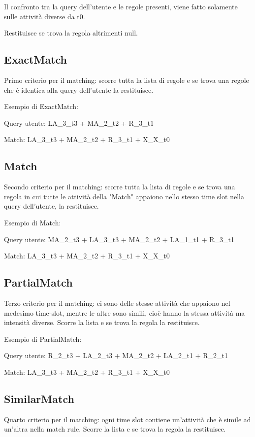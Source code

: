 \documentclass[a4paper]{article}
\begin{document}
Il confronto tra la query dell'utente e le regole presenti, viene fatto solamente sulle attività diverse da t0.

Restituisce se trova la regola altrimenti null.

\subsection{ExactMatch}
Primo criterio per il matching: scorre tutta la lista di regole e se trova una regole che è identica alla query dell'utente la restituisce. 

Esempio di ExactMatch: 

Query utente: LA\_3\_t3 + MA\_2\_t2 + R\_3\_t1

Match: LA\_3\_t3 + MA\_2\_t2 + R\_3\_t1 + X\_X\_t0

\subsection{Match}
Secondo criterio per il matching: scorre tutta la lista di regole e se trova una regola in cui tutte le attività della "Match" appaiono nello stesso time slot nella query dell'utente, la restituisce.

Esempio di Match: 

Query utente: MA\_2\_t3 + LA\_3\_t3 + MA\_2\_t2 + LA\_1\_t1 + R\_3\_t1

Match: LA\_3\_t3 + MA\_2\_t2 + R\_3\_t1 + X\_X\_t0 

\subsection{PartialMatch}
Terzo criterio per il matching: ci sono delle stesse attività che appaiono nel medesimo time-slot, mentre le altre sono simili, cioè hanno la stessa attività ma intensità diverse. Scorre la lista e se trova la regola la restituisce.

Esempio di PartialMatch: 

Query utente: R\_2\_t3 + LA\_2\_t3 + MA\_2\_t2 + LA\_2\_t1 + R\_2\_t1

Match: LA\_3\_t3 + MA\_2\_t2 + R\_3\_t1 + X\_X\_t0 

\subsection{SimilarMatch}
Quarto criterio per il matching: ogni time slot contiene un'attività che è simile ad un'altra nella match rule.
Scorre la lista e se trova la regola la restituisce.
\end{document}
